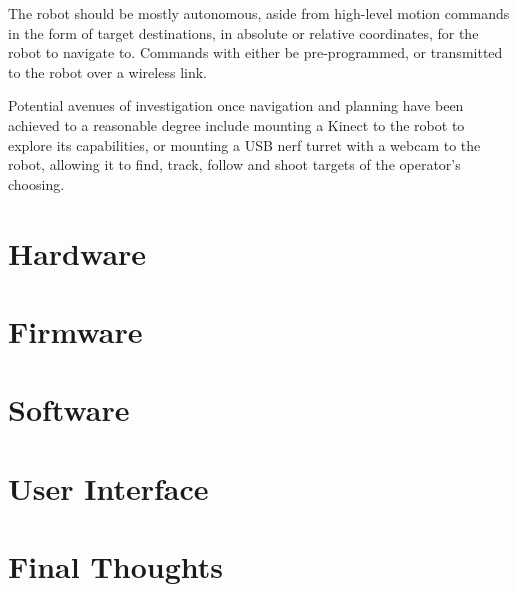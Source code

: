 \documentclass[a4paper,12pt]{article}
\begin{document}
The robot should be mostly autonomous, aside from high-level motion commands in the form of target destinations, in absolute or relative coordinates, for the robot to navigate to. Commands with either be pre-programmed, or transmitted to the robot over a wireless link.

Potential avenues of investigation once navigation and planning have been achieved to a reasonable degree include mounting a Kinect to the robot to explore its capabilities, or mounting a USB nerf turret with a webcam to the robot, allowing it to find, track, follow and shoot targets of the operator's choosing.

\section{Hardware}


\section{Firmware}


\section{Software}


\section{User Interface}


\section{Final Thoughts}

\end{document}
